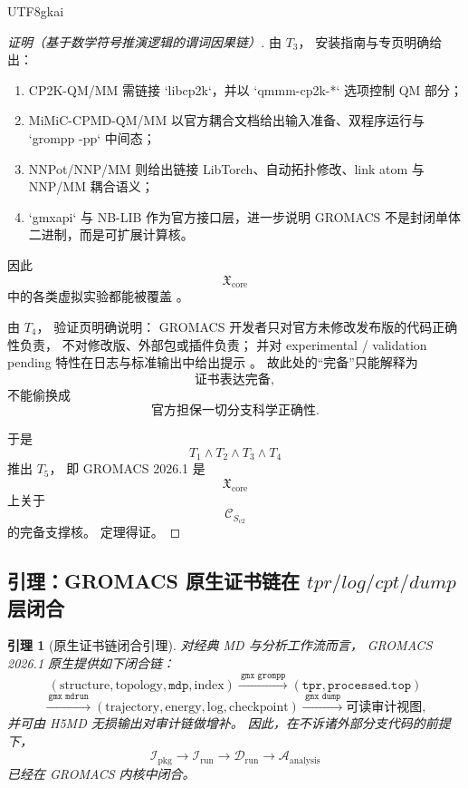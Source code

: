 \documentclass[12pt]{article}
\newtheorem{lemma}{引理}[section]
\begin{document}
\begin{CJK*}{UTF8}{gkai}
\begin{proof}[证明（基于数学符号推演逻辑的谓词因果链）]
由 $T_3$，
安装指南与专页明确给出：
\begin{enumerate}
  \item CP2K-QM/MM 需链接 `libcp2k`，并以 `qmmm-cp2k-*` 选项控制 QM 部分；
  \item MiMiC-CPMD-QM/MM 以官方耦合文档给出输入准备、双程序运行与 `grompp -pp` 中间态；
  \item NNPot/NNP/MM 则给出链接 LibTorch、自动拓扑修改、link atom 与 NNP/MM 耦合语义；
  \item `gmxapi` 与 NB-LIB 作为官方接口层，进一步说明 GROMACS 不是封闭单体二进制，而是可扩展计算核。
\end{enumerate}
因此
\[
  \mathfrak X_{\mathrm{core}}
\]
中的各类虚拟实验都能被覆盖
\cite{Gromacs2026InstallGuide,Gromacs2026CP2K,Gromacs2026MiMiC,Gromacs2026NNPot,Gromacs2026Gmxapi,Gromacs2026NBLIB}。

由 $T_4$，
验证页明确说明：
GROMACS 开发者只对官方未修改发布版的代码正确性负责，
不对修改版、外部包或插件负责；
并对 experimental / validation pending 特性在日志与标准输出中给出提示
\cite{Gromacs2026Validation}。
故此处的“完备”只能解释为
\[
  \text{证书表达完备},
\]
不能偷换成
\[
  \text{官方担保一切分支科学正确性}.
\]

于是
\[
  T_1\wedge T_2\wedge T_3\wedge T_4
\]
推出 $T_5$，
即 GROMACS 2026.1 是
\[
  \mathfrak X_{\mathrm{core}}
\]
上关于
\[
  \mathcal C_{S_{v2}}
\]
的完备支撑核。
定理得证。
\end{proof}

\subsection{引理：GROMACS 原生证书链在 \texorpdfstring{$tpr/log/cpt/dump$}{tpr/log/cpt/dump} 层闭合}
\label{subsec:tex39-ch2-lemma}

\begin{lemma}[原生证书链闭合引理]
\label{lem:tex39-native-chain}
对经典 MD 与分析工作流而言，
GROMACS 2026.1 原生提供如下闭合链：
\[
  (\text{structure},\text{topology},\texttt{mdp},\text{index})
  \xrightarrow{\ \texttt{gmx grompp}\ }
  (\texttt{tpr},\texttt{processed.top})
\]
\[
  \xrightarrow{\ \texttt{gmx mdrun}\ }
  (\text{trajectory},\text{energy},\text{log},\text{checkpoint})
  \xrightarrow{\ \texttt{gmx dump}\ }
  \text{可读审计视图},
\]
并可由 H5MD 无损输出对审计链做增补。
因此，在不诉诸外部分支代码的前提下，
\[
  \mathcal I_{\mathrm{pkg}}
  \to
  \mathcal I_{\mathrm{run}}
  \to
  \mathcal D_{\mathrm{run}}
  \to
  \mathcal A_{\mathrm{analysis}}
\]
已经在 GROMACS 内核中闭合。
\end{lemma}


\end{CJK*}
\end{document}
